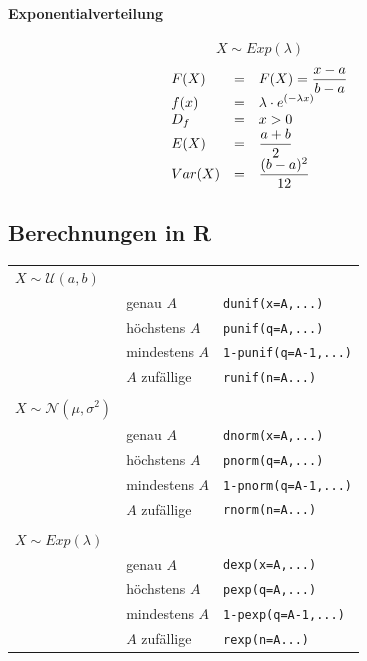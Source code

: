 \paragraph{Exponentialverteilung}
\[ X \sim Exp(\lambda) \]
\[ \begin{array}{l c l}
	F(X) 
		& =
		& F(X) = \displaystyle \frac{x-a}{b-a} \\
	f(x)	
		& =
		& \displaystyle \lambda \cdot 
				e^{\left(
					-\lambda x
				\right)} \\
	D_f	
		& = 
		& x > 0 \\
	E(X)
		& = 
		& \displaystyle \frac{a+b}{2}\\
	Var(X)	
		& =
		& \displaystyle \frac{(b-a)^2}{12}\\
\end{array} \]


\subsection{Berechnungen in R}

\begin{table}[h!]
	\begin{tabular}{l l l}
	$X \sim \mathcal{U}(a,b)$ & & \\ %
		& genau $A$ 		& \verb!dunif(x=A,...)! \\
		& höchstens $A$		& \verb!punif(q=A,...)! \\
		& mindestens $A$	& \verb!1-punif(q=A-1,...)! \\
		& $A$ zufällige 	& \verb!runif(n=A...)! \\
	& & \\
	$X \sim \mathcal{N}(\mu, \sigma^2)$ & & \\ %
		& genau $A$		& \verb!dnorm(x=A,...)! \\
		& höchstens $A$		& \verb!pnorm(q=A,...)! \\
		& mindestens $A$	& \verb!1-pnorm(q=A-1,...)! \\
		& $A$ zufällige 	& \verb!rnorm(n=A...)! \\
	& & \\
	$X \sim Exp(\lambda)$ & & \\ %
		& genau $A$		& \verb!dexp(x=A,...)! \\
		& höchstens $A$		& \verb!pexp(q=A,...)! \\
		& mindestens $A$	& \verb!1-pexp(q=A-1,...)! \\
		& $A$ zufällige 	& \verb!rexp(n=A...)! \\
	\end{tabular}
\end{table}
